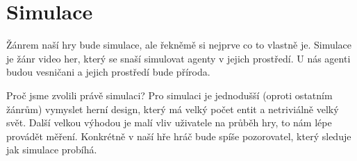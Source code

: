 \section{Simulace}
Žánrem naší hry bude simulace, ale řekněmě si nejprve co to vlastně je. Simulace je žánr video her, který se snaší simulovat agenty v jejich prostředí. U nás agenti budou vesničani a jejich prostředí bude příroda.

Proč jsme zvolili právě simulaci? Pro simulaci je jednodušší (oproti ostatním žánrům) vymyslet herní design, který má velký počet entit a netriviálně velký svět. Další velkou výhodou je malí vliv uživatele na průběh hry, to nám lépe provádět měření. Konkrétně v naší hře hráč bude spíše pozorovatel, který sleduje jak simulace probíhá.

